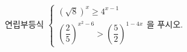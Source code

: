 연립부등식 $\begin{cases} (\sqrt{8})^{x}\ge 4^{x-1} \\ \left(\dfrac{2}{5}\right)^{x^{2}-6}>\left(\dfrac{5}{2}\right)^{1-4x} \end{cases}$을 푸시오.
